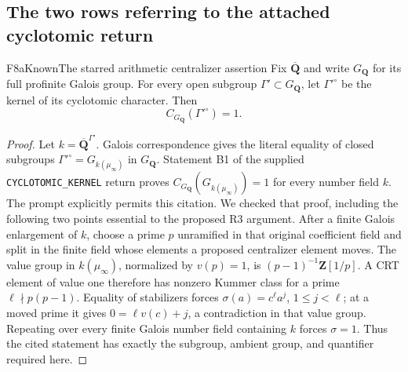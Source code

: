 \subsection{The two rows referring to the attached cyclotomic return}

\begin{result}{F8a}{Known}{The starred arithmetic centralizer assertion}
Fix $\overline{\mathbf Q}$ and write $G_{\mathbf Q}$ for its full
profinite Galois group. For every open subgroup $\Gamma'\subset G_{\mathbf Q}$,
let $\Gamma'^{\circ}$ be the kernel of its cyclotomic character. Then
\[
 C_{G_{\mathbf Q}}(\Gamma'^{\circ})=1.
\]
\end{result}
\begin{proof}
Let $k=\overline{\mathbf Q}^{\Gamma'}$. Galois correspondence gives the
literal equality of closed subgroups
$\Gamma'^{\circ}=G_{k(\mu_\infty)}$ in $G_{\mathbf Q}$.
Statement B1 of the supplied \texttt{CYCLOTOMIC\_KERNEL} return
\cite[Statement B1 and its proof]{PriorCyclotomic} proves
$C_{G_{\mathbf Q}}(G_{k(\mu_\infty)})=1$ for every number field $k$.
The prompt explicitly permits this citation. We checked that proof,
including the following two points essential to the proposed R3 argument.
After a finite Galois enlargement of $k$, choose a prime $p$ unramified
in that original coefficient field and split in the finite field whose
elements a proposed centralizer element moves. The value group in
$k(\mu_\infty)$, normalized by $v(p)=1$, is
$(p-1)^{-1}\mathbf Z[1/p]$. A CRT element of value one therefore has
nonzero Kummer class for a prime $\ell\nmid p(p-1)$. Equality of
stabilizers forces $\sigma(a)=c^\ell a^j$, $1\leq j<\ell$; at a
moved prime it gives $0=\ell v(c)+j$, a contradiction in that value
group. Repeating over every finite Galois number field containing $k$
forces $\sigma=1$. Thus the cited statement has exactly the subgroup,
ambient group, and quantifier required here.
\end{proof}


